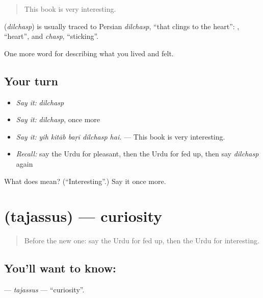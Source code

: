 \begin{quote}
This book is very interesting.
\end{quote}

\begin{cousinweb}
\textbf{} (\emph{dilchasp}) is usually traced to Persian \emph{dilchasp}, \textquotedblleft{}that clings to the heart\textquotedblright{}: \textbf{}, \textquotedblleft{}heart\textquotedblright{}, and \emph{chasp}, \textquotedblleft{}sticking\textquotedblright{}.
\end{cousinweb}

\begin{grammarlens}[title={What you've built}]
One more word for describing what you lived and felt.
\end{grammarlens}

\subsection*{Your turn}
\begin{itemize}
\raggedright
  \item \emph{Say it:} \emph{dilchasp}
  \item \emph{Say it:} \emph{dilchasp}, once more
  \item \emph{Say it:} \emph{yih kitāb baṛī dilchasp hai.} — This book is very interesting.
  \item \emph{Recall:} say the Urdu for pleasant, then the Urdu for fed up, then say \emph{dilchasp} again
\end{itemize}

\begin{tcolorbox}[breakable,colback=teal!4,colframe=teal!35!black,title={Before you move on}]
What does  mean? (\textquotedblleft{}Interesting\textquotedblright{}.) Say it once more.
\end{tcolorbox}
\section[\texorpdfstring{\ur{تجسس} (tajassus)}{تجسس (tajassus)}]{ (tajassus) — curiosity}

\label{lesson:UR-C448-tajassus}



\begin{quote}
Before the new one: say the Urdu for fed up, then the Urdu for interesting.
\end{quote}

\subsection*{You'll want to know: }
\textbf{} — \emph{tajassus} — \textquotedblleft{}curiosity\textquotedblright{}.

